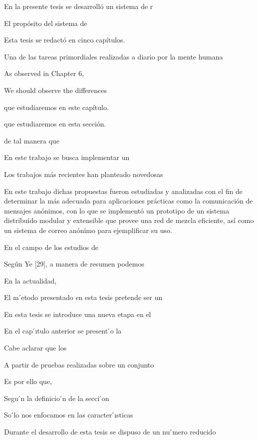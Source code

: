 En la presente tesis se desarrolló un sistema de r

El propósito del sistema de


Esta tesis se redactó en cinco capítulos. 


Una de las tareas primordiales realizadas a diario por la mente humana 



As observed in Chapter 6, 



We should observe the differences




que estudiaremos en este capítulo.


que estudiaremos en esta sección.



de tal manera que 







En este trabajo se busca implementar un 


Los trabajos más recientes han planteado novedosas

 En este trabajo dichas propuestas fueron estudiadas y analizadas con el fin de determinar la más adecuada para aplicaciones prácticas como la comunicación de mensajes anónimos, con lo que se implementó un prototipo de un sistema distribuido modular y extensible que provee una red de mezcla eficiente, así como un sistema de correo anónimo para ejemplificar su uso.



En el campo de los estudios de 



Según Ye [29], a manera de resumen podemos


En la actualidad,

El m ́etodo presentado en esta tesis pretende ser un 


En esta tesis se introduce una nueva etapa en el 



En el cap ́ıtulo anterior se present ́o la


Cabe aclarar que los 


A partir de pruebas realizadas sobre un conjunto 


Es por ello que,

Segu ́n la definicio ́n de la secci ́on


So ́lo nos enfocamos en las caracter ́ısticas

Durante el desarrollo de esta tesis se dispuso de un nu ́mero reducido 



